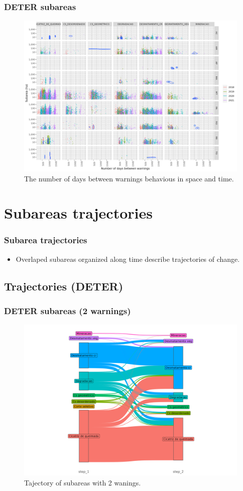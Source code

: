 \documentclass[aspectratio=169]{beamer}
\begin{document}
\begin{frame}
    \frametitle{DETER subareas}
    \begin{figure}[h] 
        \includegraphics[width=0.65\linewidth]
        {./figures/plot_deter_subarea_density_by_state_first-type_nwarnings.png}
        \caption{The number of days between warnings behavious in space and 
        time.}
        \label{fig:deter_subarea_density_state_first_type_nwarnings}
    \end{figure}
\end{frame}





\section{Subareas trajectories} 

\begin{frame}
    \frametitle{Subarea trajectories}
    \begin{itemize}
        \item Overlaped subareas organized along time describe trajectories of
            change.
    \end{itemize}
\end{frame}


\subsection{Trajectories (DETER)} 

\begin{frame}
    \frametitle{DETER subareas (2 warnings)}
    \begin{figure}[h] 
        \includegraphics[width=0.65\linewidth]
        {./figures/plot_deter_subarea_trajectory_2.png}
        \caption{Tajectory of subareas with 2 wanings.}
        \label{fig:deter_subarea_trajectory_2}
    \end{figure}
\end{frame}
\end{document}
